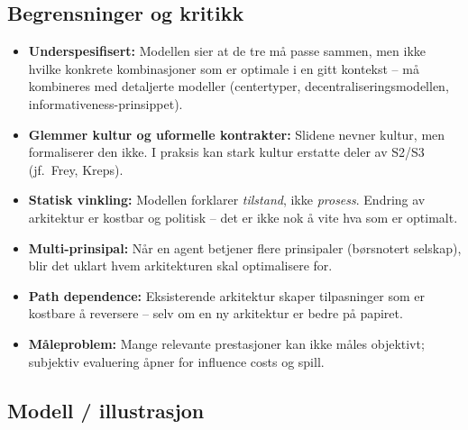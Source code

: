 \subsection*{Begrensninger og kritikk}
\begin{itemize}
\item \textbf{Underspesifisert:} Modellen sier at de tre må passe sammen, men ikke hvilke konkrete kombinasjoner som er optimale i en gitt kontekst -- må kombineres med detaljerte modeller (centertyper, decentraliseringsmodellen, informativeness-prinsippet).
\item \textbf{Glemmer kultur og uformelle kontrakter:} Slidene nevner kultur, men formaliserer den ikke. I praksis kan stark kultur erstatte deler av S2/S3 (jf.\ Frey, Kreps).
\item \textbf{Statisk vinkling:} Modellen forklarer \emph{tilstand}, ikke \emph{prosess}. Endring av arkitektur er kostbar og politisk -- det er ikke nok å vite hva som er optimalt.
\item \textbf{Multi-prinsipal:} Når en agent betjener flere prinsipaler (børsnotert selskap), blir det uklart hvem arkitekturen skal optimalisere for.
\item \textbf{Path dependence:} Eksisterende arkitektur skaper tilpasninger som er kostbare å reversere -- selv om en ny arkitektur er bedre på papiret.
\item \textbf{Måleproblem:} Mange relevante prestasjoner kan ikke måles objektivt; subjektiv evaluering åpner for influence costs og spill.
\end{itemize}

\subsection*{Modell / illustrasjon}

